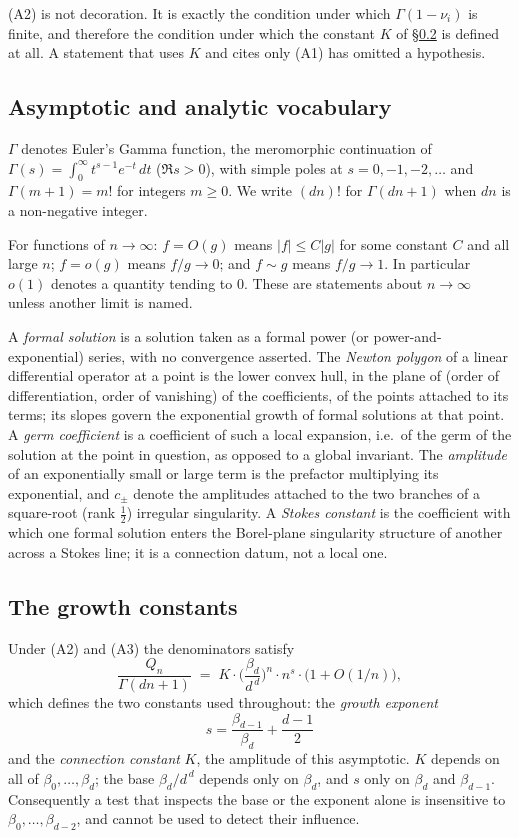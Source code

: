 (A2) is not decoration. It is exactly the condition under which
$\Gamma(1-\nu_i)$ is finite, and therefore the condition under which the
constant $K$ of \S\ref{ssec:growth} is defined at all. A statement that uses
$K$ and cites only (A1) has omitted a hypothesis.

\subsection{Asymptotic and analytic vocabulary}\label{ssec:asymptotic}

$\Gamma$ denotes Euler's Gamma function, the meromorphic continuation of
$\Gamma(s)=\int_0^\infty t^{s-1}e^{-t}\,dt$ ($\Re s>0$), with simple poles at
$s=0,-1,-2,\dots$ and $\Gamma(m+1)=m!$ for integers $m\ge0$. We write $(dn)!$
for $\Gamma(dn+1)$ when $dn$ is a non-negative integer.

For functions of $n\to\infty$: $f=O(g)$ means $|f|\le C|g|$ for some constant
$C$ and all large $n$; $f=o(g)$ means $f/g\to0$; and $f\sim g$ means
$f/g\to1$. In particular $o(1)$ denotes a quantity tending to $0$. These are
statements about $n\to\infty$ unless another limit is named.

A \emph{formal solution} is a solution taken as a formal power (or
power-and-exponential) series, with no convergence asserted. The
\emph{Newton polygon} of a linear differential operator at a point is the lower
convex hull, in the plane of (order of differentiation, order of vanishing) of
the coefficients, of the points attached to its terms; its slopes govern the
exponential growth of formal solutions at that point. A \emph{germ
coefficient} is a coefficient of such a local expansion, i.e.\ of the germ of
the solution at the point in question, as opposed to a global invariant. The
\emph{amplitude} of an exponentially small or large term is the prefactor
multiplying its exponential, and $c_\pm$ denote the amplitudes attached to the
two branches of a square-root (rank $\tfrac12$) irregular singularity. A
\emph{Stokes constant} is the coefficient with which one formal solution enters
the Borel-plane singularity structure of another across a Stokes line; it is a
connection datum, not a local one.

\subsection{The growth constants}\label{ssec:growth}

Under (A2) and (A3) the denominators satisfy
\[
  \frac{Q_n}{\Gamma(dn+1)}\;=\;K\cdot\Big(\frac{\beta_d}{d^{\,d}}\Big)^{n}
  \cdot n^{s}\cdot\bigl(1+O(1/n)\bigr) ,
\]
which defines the two constants used throughout: the \emph{growth exponent}
\[
  s=\frac{\beta_{d-1}}{\beta_d}+\frac{d-1}{2}
\]
and the \emph{connection constant} $K$, the amplitude of this asymptotic. $K$
depends on all of $\beta_0,\dots,\beta_d$; the base $\beta_d/d^{\,d}$ depends
only on $\beta_d$, and $s$ only on $\beta_d$ and $\beta_{d-1}$. Consequently a
test that inspects the base or the exponent alone is insensitive to
$\beta_0,\dots,\beta_{d-2}$, and cannot be used to detect their influence.

